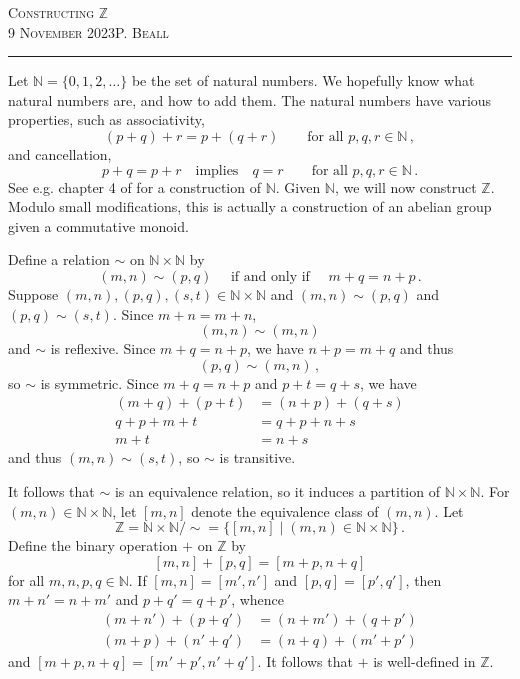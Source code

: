 \documentclass[12pt,a4paper]{article}
\begin{document}
\newpage

\noindent\textsc{\hfill Constructing $\mathbb{Z}$ \hfill} \\
\noindent\textsc{9 November 2023\hfill P. Beall}\vspace{0.5em}
\hrule\vspace{0.5em}
\begin{abstract}
	Integers have applications in some areas of math. The integers form the smallest group containing the natural numbers. I will present a construction of the integers from the naturals, and if time permits, I will briefly outline a construction of the rationals from the integers.
\end{abstract}

Let $\mathbb{N} = \{0,1,2,\dots\}$ be the set of natural numbers. We hopefully know what natural numbers are, and how to add them. The natural numbers have various properties, such as associativity,
\[
	(p+q) + r = p + (q+r)\qquad\text{for all } p,q,r\in\mathbb{N}\,,
\]
and cancellation,
\[
	p + q = p + r \quad\text{implies}\quad q=r\qquad\text{for all } p,q,r\in\mathbb{N}\,.
\]
See e.g. chapter 4 of \cite{Enderton} for a construction of $\mathbb{N}$. Given $\mathbb{N}$, we will now construct $\mathbb{Z}$. Modulo small modifications, this is actually a construction of an abelian group given a commutative monoid.

Define a relation $\sim$ on $\mathbb{N}\times\mathbb{N}$ by
\[
	(m,n)\sim (p,q) \quad\text{ if and only if }\quad m+q = n+p\,.
\]
Suppose $(m,n), (p,q), (s,t)\in\mathbb{N}\times\mathbb{N}$ and $(m,n)\sim(p,q)$ and $(p,q)\sim (s,t)$. Since $m+n=m+n$,
\[
	(m,n)\sim(m,n)
\]
and $\sim$ is reflexive. Since $m+q=n+p$, we have $n+p=m+q$ and thus
\[
	(p,q)\sim(m,n)\,,
\]
so $\sim$ is symmetric. Since $m+q=n+p$ and $p+t=q+s$, we have
\begin{align*}
	(m+q) + (p+t) &= (n+p) + (q+s) \\
	q+p+m+t &= q+p+n+s \\
	m+t &= n+s
\end{align*}
and thus $(m,n)\sim (s,t)$, so $\sim$ is transitive.

It follows that $\sim$ is an equivalence relation, so it induces a partition of $\mathbb{N}\times\mathbb{N}$. For $(m,n)\in\mathbb{N}\times\mathbb{N}$, let $[m,n]$ denote the equivalence class of $(m,n)$. Let
\[
	\mathbb{Z} = {\mathbb{N}\times\mathbb{N}/\sim} = \{[m,n] \mid (m,n)\in\mathbb{N}\times\mathbb{N}\}\,.
\]
Define the binary operation $+$ on $\mathbb{Z}$ by
\[
	[m,n] + [p,q] = [m+p, n+q]
\]
for all $m,n,p,q\in\mathbb{N}$. If $[m,n] = [m',n']$ and $[p,q]=[p',q']$, then $m+n'=n+m'$ and $p+q'=q+p'$, whence
\begin{align*}
	(m+n') + (p+q')&= (n+m') + (q+p') \\
	(m+p) + (n'+q') &= (n+q) + (m'+p')
\end{align*}
and $[m+p,n+q] = [m'+p',n'+q']$. It follows that $+$ is well-defined in $\mathbb{Z}$.
\end{document}
